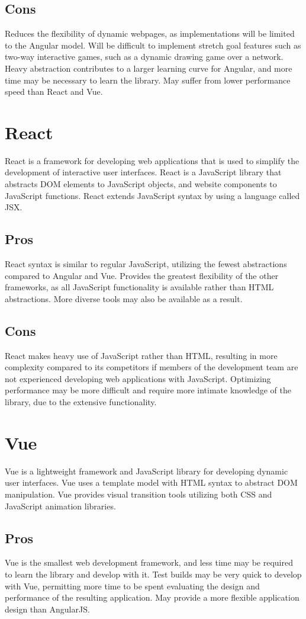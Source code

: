 \documentclass[letterpaper,10pt,draftclsnofoot,onecolumn]{IEEEtran}
\begin{document}
\subsection*{Cons}
Reduces the flexibility of dynamic webpages, as implementations will be limited to the Angular model.
Will be difficult to implement stretch goal features such as two-way interactive games, such as a dynamic drawing game over a network.
Heavy abstraction contributes to a larger learning curve for Angular, and more time may be necessary to learn the library.
May suffer from lower performance speed than React and Vue.
\section*{React}
React is a framework for developing web applications that is used to simplify the development of interactive user interfaces. React is a JavaScript library that abstracts DOM elements to JavaScript objects, and website components to JavaScript functions. React extends JavaScript syntax by using a language called JSX.
\subsection*{Pros}
React syntax is similar to regular JavaScript, utilizing the fewest abstractions compared to Angular and Vue.
Provides the greatest flexibility of the other frameworks, as all JavaScript functionality is available rather than HTML abstractions. More diverse tools may also be available as a result.
\subsection*{Cons}
React makes heavy use of JavaScript rather than HTML, resulting in more complexity compared to its competitors if members of the development team are not experienced developing web applications with JavaScript.
Optimizing performance may be more difficult and require more intimate knowledge of the library, due to the extensive functionality.
\section*{Vue}
Vue is a lightweight framework and JavaScript library for developing dynamic user interfaces. Vue uses a template model with HTML syntax to abstract DOM manipulation. Vue provides visual transition tools utilizing both CSS and JavaScript animation libraries.
\subsection*{Pros}
Vue is the smallest web development framework, and less time may be required to learn the library and develop with it. Test builds may be very quick to develop with Vue, permitting more time to be spent evaluating the design and performance of the resulting application.
May provide a more flexible application design than AngularJS.
\end{document}
